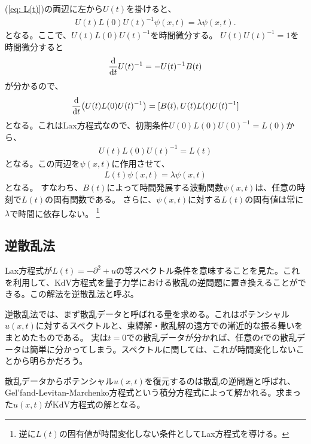 \documentclass[11pt]{ltjsarticle}
\numberwithin{equation}{section}
\begin{document}
(\ref{eq: L(t)})の両辺に左から$U(t)$を掛けると、
\begin{align}
    U(t)L(0)U(t)^{-1}ψ(x,t) = λ ψ(x,t).
\end{align}
となる。ここで、$U(t)L(0)U(t)^{-1}$を時間微分する。
$U(t)U(t)^{-1} = 1$を時間微分すると
\begin{align}
    \dv{t}U(t)^{-1} = - U(t)^{-1}B(t)
\end{align}
が分かるので、
\begin{align}
    \dv{t}\qty(U(t)L(0)U(t)^{-1}) = [B(t), U(t)L(t)U(t)^{-1}]
\end{align}
となる。これはLax方程式なので、初期条件$U(0)L(0)U(0)^{-1} = L(0)$から、
\begin{align}
    U(t)L(0)U(t)^{-1} = L(t)
\end{align}
となる。この両辺を$ψ(x,t)$に作用させて、
\begin{align}
    L(t)ψ(x, t) = λ ψ(x, t)
\end{align}
となる。
すなわち、$B(t)$によって時間発展する波動関数$ψ(x, t)$は、任意の時刻で$L(t)$の固有関数である。
さらに、$ψ(x,t)$に対する$L(t)$の固有値は常に$λ$で時間に依存しない。
\footnote{
    逆に$L(t)$の固有値が時間変化しない条件としてLax方程式を導ける。
}

\subsection{
    逆散乱法
}
Lax方程式が$L(t) = -∂^2 + u$の等スペクトル条件を意味することを見た。これを利用して、KdV方程式を量子力学における散乱の逆問題に置き換えることができる。この解法を逆散乱法と呼ぶ。

逆散乱法では、まず散乱データと呼ばれる量を求める。これはポテンシャル$u(x, t)$に対するスペクトルと、束縛解・散乱解の遠方での漸近的な振る舞いをまとめたものである。
実は$t = 0$での散乱データが分かれば、任意の$t$での散乱データは簡単に分かってしまう。スペクトルに関しては、これが時間変化しないことから明らかだろう。

散乱データからポテンシャル$u(x, t)$を復元するのは散乱の逆問題と呼ばれ、Gel'fand-Levitan-Marchenko方程式という積分方程式によって解かれる。求まった$u(x, t)$がKdV方程式の解となる。
\end{document}
